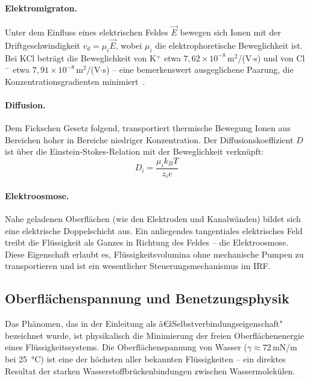 ﻿\documentclass[a4paper,12pt]{scrreprt}
\theoremstyle{definition}
\begin{document}
\paragraph{Elektromigraton.}
Unter dem Einfluss eines elektrischen Feldes $\vec{E}$ bewegen sich Ionen
mit der Driftgeschwindigkeit $v_d = \mu_i \vec{E}$, wobei $\mu_i$ die
elektrophoretische Beweglichkeit ist. Bei KCl beträgt die Beweglichkeit von
K$^+$ etwa $7{,}62 \times 10^{-8}$\,m$^2$/(V$\cdot$s) und von Cl$^-$ etwa
$7{,}91 \times 10^{-8}$\,m$^2$/(V$\cdot$s) -- eine bemerkenswert ausgeglichene
Paarung, die Konzentrationsgradienten minimiert~\cite{atkins2018}.

\paragraph{Diffusion.}
Dem Fickschen Gesetz folgend, transportiert thermische Bewegung Ionen aus
Bereichen hoher in Bereiche niedriger Konzentration. Der Diffusionskoeffizient
$D$ ist über die Einstein-Stokes-Relation mit der Beweglichkeit verknüpft:
\begin{equation}
	D_i = \frac{\mu_i k_B T}{z_i e}
	\label{eq:einstein_stokes}
\end{equation}

\paragraph{Elektroosmose.}
Nahe geladenen Oberflächen (wie den Elektroden und Kanalwänden) bildet sich
eine elektrische Doppelschicht aus. Ein anliegendes tangentiales elektrisches
Feld treibt die Flüssigkeit als Ganzes in Richtung des Feldes -- die
Elektroosmose. Diese Eigenschaft erlaubt es, Flüssigkeitsvolumina ohne
mechanische Pumpen zu transportieren und ist ein wesentlicher
Steuerungsmechanismus im IRF.

\subsection{Oberflächenspannung und Benetzungsphysik}

Das Phänomen, das in der Einleitung als â€žSelbstverbindungseigenschaft"
bezeichnet wurde, ist physikalisch die Minimierung der freien Oberflächenenergie
eines Flüssigkeitssystems. Die Oberflächenspannung von Wasser
($\gamma \approx 72$\,mN/m bei 25\, °C) ist eine der höchsten aller bekannten
Flüssigkeiten -- ein direktes Resultat der starken Wasserstoffbrückenbindungen
zwischen Wassermolekülen.
\end{document}
